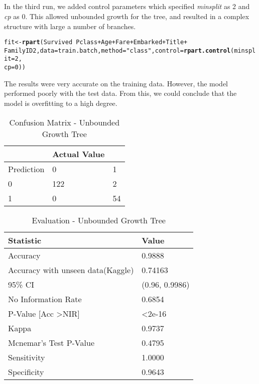 \documentclass[a4paper,10pt]{report}\usepackage[]{graphicx}\usepackage[]{color}
\makeatletter
\newcommand{\hlnum}[1]{\textcolor[rgb]{0.686,0.059,0.569}{#1}}%
\newcommand{\hlstr}[1]{\textcolor[rgb]{0.192,0.494,0.8}{#1}}%
\newcommand{\hlopt}[1]{\textcolor[rgb]{0,0,0}{#1}}%
\newcommand{\hlstd}[1]{\textcolor[rgb]{0.345,0.345,0.345}{#1}}%
\newcommand{\hlkwb}[1]{\textcolor[rgb]{0.69,0.353,0.396}{#1}}%
\newcommand{\hlkwc}[1]{\textcolor[rgb]{0.333,0.667,0.333}{#1}}%
\newcommand{\hlkwd}[1]{\textcolor[rgb]{0.737,0.353,0.396}{\textbf{#1}}}%
\newenvironment{kframe}{%
 \def\at@end@of@kframe{}%
 \ifinner\ifhmode%
  \def\at@end@of@kframe{\end{minipage}}%
  \begin{minipage}{\columnwidth}%
 \fi\fi%
 \def\FrameCommand##1{\hskip\@totalleftmargin \hskip-\fboxsep
 \colorbox{shadecolor}{##1}\hskip-\fboxsep
     \hskip-\linewidth \hskip-\@totalleftmargin \hskip\columnwidth}%
 \MakeFramed {\advance\hsize-\width
   \@totalleftmargin\z@ \linewidth\hsize
   \@setminipage}}%
 {\par\unskip\endMakeFramed%
 \at@end@of@kframe}
\newenvironment{knitrout}{}{} %
\makeatother
\begin{document}
\subsection{}
In the third run, we added control parameters which specified \emph{minsplit} as 2 and \emph{cp} as 0. This allowed unbounded growth for the tree, and resulted in a complex structure with large a number of branches.
\begin{knitrout}
\color{fgcolor}\begin{kframe}
\begin{alltt}
\hlstd{fit} \hlkwb{<-} \hlkwd{rpart}\hlstd{(Survived} \hlopt{~} \hlstd{Pclass} \hlopt{+} \hlstd{Age} \hlopt{+} \hlstd{Fare} \hlopt{+} \hlstd{Embarked} \hlopt{+} \hlstd{Title} \hlopt{+}
    \hlstd{FamilyID2,} \hlkwc{data} \hlstd{= train.batch,} \hlkwc{method} \hlstd{=} \hlstr{"class"}\hlstd{,} \hlkwc{control} \hlstd{=} \hlkwd{rpart.control}\hlstd{(}\hlkwc{minsplit} \hlstd{=} \hlnum{2}\hlstd{,}
    \hlkwc{cp} \hlstd{=} \hlnum{0}\hlstd{))}
\end{alltt}
\end{kframe}
\end{knitrout}
The results were very accurate on the training data. However, the model performed poorly with the test data. From this, we could conclude that the model is overfitting to a high degree. 
 \begin{table}
    \begin{tabular}{|l|l|l|}
    \hline
    ~          & Actual Value  & ~  \\ \hline
    Prediction & 0             & 1  \\ \hline
    0          & 122           & 2 \\
    1          & 0             & 54 \\ \hline
    \end{tabular}
    \caption{Confusion Matrix - Unbounded Growth Tree}
\end{table}

\begin{table}
    \begin{tabular}{|l|l|}
    \hline
    Statistic              & Value           \\ \hline
    Accuracy               & 0.9888          \\
    Accuracy with unseen data(Kaggle)               & 0.74163 \\ 
    95\% CI                & (0.96, 0.9986) \\
    No Information Rate    & 0.6854          \\
    P-Value [Acc \textgreater NIR]    &  \textless2e-16      \\
    Kappa                  &  0.9737         \\
    Mcnemar's Test P-Value & 0.4795          \\
    Sensitivity            &  1.0000         \\
    Specificity            & 0.9643          \\ \hline
    \end{tabular}
    \caption{Evaluation - Unbounded Growth Tree}
\end{table}
\end{document}
